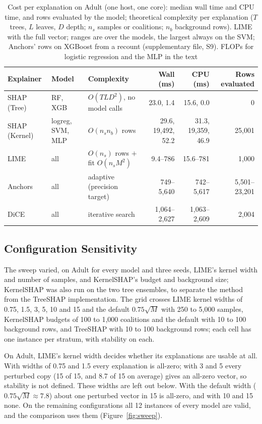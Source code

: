 \documentclass[11pt,a4paper]{article}
\begin{document}
\begin{table}[htb]
\centering
\caption{Cost per explanation on Adult (one host, one core): median wall time
and CPU time, and rows evaluated by the model; theoretical complexity per explanation
($T$ trees, $L$ leaves, $D$ depth; $n_s$ samples or coalitions; $n_b$
background rows). LIME with the full vector; ranges are over the models,
the largest always on the SVM; Anchors' rows on XGBoost from a recount
(supplementary file, S9). FLOPs for logistic regression and the MLP in the text}
\label{tab:cost}
\begin{tabular}{lllrrr}
\toprule
Explainer & Model & Complexity & Wall (ms) & CPU (ms) & Rows evaluated \\
\midrule
SHAP (Tree) & RF, XGB & $O(T L D^2)$, no model calls & 23.0, 1.4 & 15.6, 0.0 & 0 \\
SHAP (Kernel) & logreg, SVM, MLP & $O(n_s n_b)$ rows & 29.6, 19,492, 52.2 & 31.3, 19,359, 46.9 & 25,001 \\
LIME & all & $O(n_s)$ rows $+$ fit $O(n_s M^2)$ & 9.4--786 & 15.6--781 & 1,000 \\
Anchors & all & adaptive (precision target) & 749--5,640 & 742--5,617 & 5,501--23,201 \\
DiCE & all & iterative search & 1,064--2,627 & 1,063--2,609 & 2,004 \\
\bottomrule
\end{tabular}
\end{table}

\subsection{Configuration Sensitivity}
\label{sec:sweep}

The sweep varied, on Adult for every model and three seeds, LIME's kernel
width and number of samples, and KernelSHAP's budget and background size;
KernelSHAP was also run on the two tree ensembles, to separate the method
from the TreeSHAP implementation. The grid crosses LIME kernel widths of
0.75, 1.5, 3, 5, 10 and 15 and the default $0.75\sqrt{M}$ with 250 to 5,000
samples, KernelSHAP budgets of 100 to 1,000 coalitions and the default with
10 to 100 background rows, and TreeSHAP with 10 to 100 background rows; each
cell has one instance per stratum, with stability on each.

On Adult, LIME's kernel width decides whether its explanations are usable at
all. With widths of 0.75 and 1.5 every explanation is all-zero; with 3 and 5
every perturbed copy (15 of 15, and 8.7 of 15 on average) gives an all-zero
vector, so stability is not defined. These widths are left out below. With
the default width ($0.75\sqrt{M} \approx 7.8$) about one perturbed vector in
15 is all-zero, and with 10 and 15 none. On the remaining configurations all
12 instances of every model are valid, and the comparison uses them
(Figure~\ref{fig:sweep}).
\end{document}
